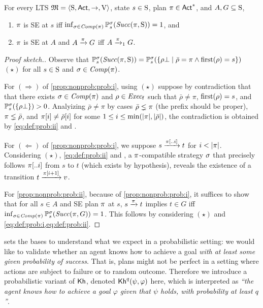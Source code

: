 \begin{proposition}\label{prop:nonprob:prob}
  For every LTS $\model=\tup{\S,\Act,\ra,\V}$, state $s\in\S$, plan
  $\plan\in\Act^*$, and $A,G\subseteq\S$,
  \begin{enumerate}
  \item\label{prop:nonprob:prob:i}%
    $\plan$ is SE at $s$ iff
    $\inf_{\strat\in\Comp(\plan)}\Prob^\strat_s(\Succ(\plan,\S))=1$,
    and
  \item\label{prop:nonprob:prob:ii}%
    $\plan$ is SE at $A$ and $A \reach{\plan} G$ iff $A \reach{\plan}_1 G$.
  \end{enumerate}
\end{proposition}
%
\begin{proof}[Proof sketch.]
  Observe that
  $\Prob^\strat_s(\Succ(\plan,\S)) =
  \Prob^\strat_s(\{{\rho\complete}\mid{\bar{\rho}=\plan}\wedge{\first(\rho)=s}\})$~$(\star)$
  for all $s\in\S$ and $\strat\in\Comp(\plan)$.

  For $(\Rightarrow)$ of \cref{prop:nonprob:prob:i}, using $(\star)$
  suppose by contradiction that that there exists
  $\strat\in\Comp(\plan)$ and $\rho\in\execf$ such that
  $\bar{\rho}\neq\pi$, $\first(\rho)=s$, and
  $\Prob^\strat_s(\{\rho\complete\})>0$.
  Analyizing $\bar{\rho}\neq\pi$ by cases $\bar{\rho}\lneq\plan$ (the
  prefix should be proper), $\plan\lneq\bar{\rho}$, and
  $\plan[i]\neq\bar{\rho}[i]$ for some $1\leq i
  \leq\min(\size{\plan},\size{\bar{\rho}})$, the contradiction is
  obtained by \cref{eq:def:prob:ii} and .
  
  For $(\Leftarrow)$ of \cref{prop:nonprob:prob:i}, we
  suppose $s\reach{\plan[..i]}t$ for $i<\size{\plan}$.  Considering
  $(\star)$, \cref{eq:def:prob:ii} and , a
  $\plan$-compatible strategy $\strat$ that precisely follows
  $\plan[..i]$ from $s$ to $t$ (which exists by hypothesis),
  reveals the existence of a transition $t\reach{\plan[i{+}1]}v$.

  For \cref{prop:nonprob:prob:ii}, because of \cref{prop:nonprob:prob:i},
  it suffices to show that for all $s\in A$ and SE plan $\plan$ at
  $s$, $s \reach{\plan} t$ implies $t\in G$ iff
  $\inf_{\strat\in\Comp(\plan)}\Prob^\strat_s(\Succ(\plan,G))=1$.
  This follows by considering $(\star)$ and
  \cref{eq:def:prob:i,eq:def:prob:ii}.
\end{proof}


 sets the bases to understand what we expect in
a probabilistic setting: we would like to validate whether an agent
knows how to achieve a goal \emph{with at least some given probability
of success}.  That is, plans might not be perfect in a setting where
actions are subject to failure or to random outcome.
%
Therefore we introduce a probabilistic variant of $\kh$,
denoted $\kh^q(\psi,\varphi)$ here, which is interpreted as \emph{``the agent knows
how to achieve a goal $\varphi$ given that $\psi$ holds, with
probability at least $q$''}.


